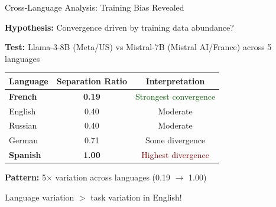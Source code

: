 \documentclass[aspectratio=169,11pt]{beamer}
\begin{document}
\begin{frame}{Cross-Language Analysis: Training Bias Revealed}

\textbf{Hypothesis:} Convergence driven by training data abundance?

\vspace{0.5em}

\textbf{Test:} Llama-3-8B (Meta/US) vs Mistral-7B (Mistral AI/France) across 5 languages

\vspace{0.5em}

\begin{center}
\begin{tabular}{lcc}
\toprule
\textbf{Language} & \textbf{Separation Ratio} & \textbf{Interpretation} \\
\midrule
\textbf{French} & \textbf{0.19} & \textcolor{darkgreen}{Strongest convergence} \\
English & 0.40 & Moderate \\
Russian & 0.40 & Moderate \\
German & 0.71 & Some divergence \\
\textbf{Spanish} & \textbf{1.00} & \textcolor{darkred}{Highest divergence} \\
\bottomrule
\end{tabular}
\end{center}

\vspace{0.5em}

\textbf{Pattern:} 5$\times$ variation across languages (0.19 $\to$ 1.00)

Language variation $>$ task variation in English!

\end{frame}
\end{document}
